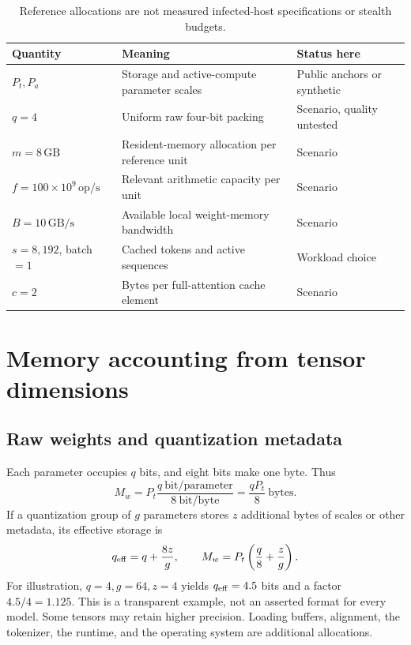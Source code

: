 \documentclass[11pt]{article}
\newcommand{\GB}{\,\mathrm{GB}}
\begin{document}
\begin{table}[ht]
\centering\small
\begin{tabularx}{\textwidth}{lXl}
\toprule Quantity & Meaning & Status here\\\midrule
$P_t,P_a$ & Storage and active-compute parameter scales & Public anchors or synthetic\\
$q=4$ & Uniform raw four-bit packing & Scenario, quality untested\\
$m=8\GB$ & Resident-memory allocation per reference unit & Scenario\\
$f=100\times10^9\,\mathrm{op/s}$ & Relevant arithmetic capacity per unit & Scenario\\
$B=10\GB/\mathrm s$ & Available local weight-memory bandwidth & Scenario\\
$s=8{,}192$, batch $=1$ & Cached tokens and active sequences & Workload choice\\
$c=2$ & Bytes per full-attention cache element & Scenario\\
\bottomrule
\end{tabularx}
\caption{Reference allocations are not measured infected-host specifications or stealth budgets.}
\end{table}

\section{Memory accounting from tensor dimensions}
\subsection{Raw weights and quantization metadata}
Each parameter occupies $q$ bits, and eight bits make one byte. Thus
\begin{equation}\label{eq:weights}
M_w=P_t\frac{q\ \mathrm{bit/parameter}}{8\ \mathrm{bit/byte}}=\frac{qP_t}{8}\ \mathrm{bytes}.
\end{equation}
If a quantization group of $g$ parameters stores $z$ additional bytes of scales or other metadata, its effective storage is
\begin{equation}
q_{\rm eff}=q+\frac{8z}{g},\qquad M_w=P_t\left(\frac q8+\frac zg\right).
\end{equation}
For illustration, $q=4,g=64,z=4$ yields $q_{\rm eff}=4.5$ bits and a factor $4.5/4=1.125$. This is a transparent example, not an asserted format for every model. Some tensors may retain higher precision. Loading buffers, alignment, the tokenizer, the runtime, and the operating system are additional allocations.
\end{document}

